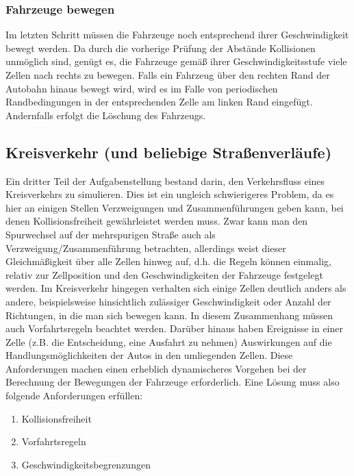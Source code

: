 \documentclass[10pt, a4paper]{article}
\begin{document}
\subsubsection{Fahrzeuge bewegen}
\label{subsubsec:fahrzeugeBewegen}

Im letzten Schritt müssen die Fahrzeuge noch entsprechend ihrer Geschwindigkeit bewegt werden. Da durch die vorherige Prüfung der Abstände Kollisionen unmöglich sind, genügt es, die Fahrzeuge gemäß ihrer Geschwindigkeitsstufe viele Zellen nach rechts zu bewegen. Falls ein Fahrzeug über den rechten Rand der Autobahn hinaus bewegt wird, wird es im Falle von periodischen Randbedingungen in der entsprechenden Zelle am linken Rand eingefügt. Andernfalls erfolgt die Löschung des Fahrzeugs. 

\subsection{Kreisverkehr (und beliebige Straßenverläufe)}
\label{subsec:umsetzung-kreisverkehr}

Ein dritter Teil der Aufgabenstellung bestand darin, den Verkehrsfluss eines Kreisverkehrs zu simulieren. Dies ist ein ungleich schwierigeres Problem, da es hier an einigen Stellen Verzweigungen und Zusammenführungen geben kann, bei denen Kollisionsfreiheit gewährleistet werden muss. Zwar kann man den Spurwechsel auf der mehrspurigen Straße auch als Verzweigung/Zusammenführung betrachten, allerdings weist dieser Gleichmäßigkeit über alle Zellen hinweg auf, d.h. die Regeln können einmalig, relativ zur Zellposition und den Geschwindigkeiten der Fahrzeuge festgelegt werden. Im Kreisverkehr hingegen verhalten sich einige Zellen deutlich anders als andere, beispielsweise hinsichtlich zulässiger Geschwindigkeit oder Anzahl der Richtungen, in die man sich bewegen kann. In diesem Zusammenhang müssen auch Vorfahrtsregeln beachtet werden. Darüber hinaus haben Ereignisse in einer Zelle (z.B. die Entscheidung, eine Ausfahrt zu nehmen) Auswirkungen auf die Handlungsmöglichkeiten der Autos in den umliegenden Zellen. Diese Anforderungen machen einen erheblich dynamischeres Vorgehen bei der Berechnung der Bewegungen der Fahrzeuge erforderlich. Eine Lösung muss also folgende Anforderungen erfüllen:

\begin{enumerate}
	\item Kollisionsfreiheit
	\item Vorfahrtsregeln
	\item Geschwindigkeitsbegrenzungen
\end{enumerate}
\end{document}
